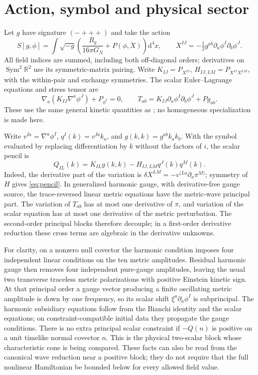 \documentclass[11pt]{article}
\newcommand{\RR}{\mathbb R}
\newcommand{\dd}{\mathrm d}
\begin{document}
\section{Action, symbol and physical sector}
Let \(g\) have signature \((-+++)\) and take the action
\[
 S[g,\phi]=\int \sqrt{-g}\left(\frac{R_g}{16\pi G_N}+P(\phi,X)\right)\dd^4x,
 \qquad X^{IJ}=-\tfrac12g^{ab}\partial_a\phi^I\partial_b\phi^J .
\]
All field indices are summed, including both off-diagonal orders; derivatives on \(\operatorname{Sym}^2\RR^2\) use its symmetric-matrix pairing. Write \(K_{IJ}=P_{X^{IJ}}\), \(H_{IJ,LM}=P_{X^{IJ}X^{LM}}\), with the within-pair and exchange symmetries. The scalar Euler--Lagrange equations and stress tensor are
\[
 \nabla_a(K_{IJ}\nabla^a\phi^J)+P_{\phi^I}=0,
 \qquad T_{ab}=K_{IJ}\partial_a\phi^I\partial_b\phi^J+P g_{ab}.
\]
These use the same general kinetic quantities as \cite[Secs.~III--V]{LRST}; no homogeneous specialization is made here.

Write \(v^{Ia}=\nabla^a\phi^I\), \(q^I(k)=v^{Ia}k_a\), and \(g(k,k)=g^{ab}k_a k_b\). With the symbol evaluated by replacing differentiation by \(k\) without the factors of \(i\), the scalar pencil is
\begin{equation}
 Q_{IL}(k)=K_{IL}g(k,k)-H_{IJ,LM}q^J(k)q^M(k).
 \label{eq:pencil}
\end{equation}
Indeed, the derivative part of the variation is \(\delta X^{LM}=-v^{(La}\partial_a\pi^{M)}\); symmetry of \(H\) gives \eqref{eq:pencil}. In generalized harmonic gauge, with derivative-free gauge source, the trace-reversed linear metric equations have the metric-wave principal part. The variation of \(T_{ab}\) has at most one derivative of \(\pi\), and variation of the scalar equation has at most one derivative of the metric perturbation. The second-order principal blocks therefore decouple; in a first-order derivative reduction these cross terms are algebraic in the derivative unknowns.

For clarity, on a nonzero null covector the harmonic condition imposes four independent linear conditions on the ten metric amplitudes. Residual harmonic gauge then removes four independent pure-gauge amplitudes, leaving the usual two transverse traceless metric polarizations with positive Einstein kinetic sign. At that principal order a gauge vector producing a finite oscillating metric amplitude is down by one frequency, so its scalar shift \(\xi^a\partial_a\phi^I\) is subprincipal. The harmonic subsidiary equations follow from the Bianchi identity and the scalar equations; on constraint-compatible initial data they propagate the gauge conditions. There is no extra principal scalar constraint if \(-Q(n)\) is positive on a unit timelike normal covector \(n\). This is the physical two-scalar block whose characteristic cone is being compared. These facts can also be read from the canonical wave reduction near a positive block; they do not require that the full nonlinear Hamiltonian be bounded below for every allowed field value.
\end{document}
